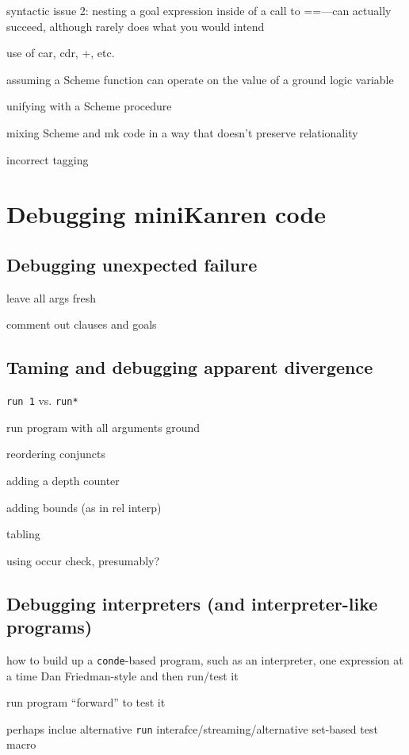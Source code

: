 \documentclass{book}
\begin{document}
syntactic issue 2:
nesting a goal expression inside of a call to ==---can actually succeed, although rarely does what you would intend

use of car, cdr, +, etc.

assuming a Scheme function can operate on the value of a ground logic variable

unifying with a Scheme procedure

mixing Scheme and mk code in a way that doesn't preserve relationality

incorrect tagging

\chapter{Debugging miniKanren code}%

\section{Debugging unexpected failure}

leave all args fresh

comment out clauses and goals

\section{Taming and debugging apparent divergence}

\verb|run 1| vs. \verb|run*|

run program with all arguments ground

reordering conjuncts

adding a depth counter

adding bounds (as in rel interp)

tabling

using occur check, presumably?

\section{Debugging interpreters (and interpreter-like programs)}

how to build up a \verb|conde|-based program, such as an interpreter, one expression at a time Dan Friedman-style and then run/test it

run program ``forward'' to test it

perhaps inclue alternative \verb|run| interafce/streaming/alternative set-based test macro
\end{document}
